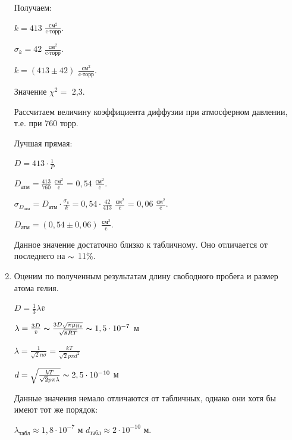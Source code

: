 \documentclass[a4paper,12pt]{article} %
\begin{document}
\begin{enumerate}
\newpage

Получаем:

$k = 413$ $\frac{\text{см}^2}{\text{c}\cdot\text{торр}}$.

$\sigma_{k} = 42$ $\frac{\text{см}^2}{\text{c}\cdot\text{торр}}$.

$k = (413 \pm 42)$ $\frac{\text{см}^2}{\text{c}\cdot\text{торр}}$.

\vspace{10mm}

Значение $\chi^2 = $ 2,3.

\vspace{15mm}

Рассчитаем величину коэффициента диффузии при атмосферном давлении, т.е. при 760 торр. 


Лучшая прямая:

$D = 413\cdot \frac{1}{P}$

$D_{\text{атм}} = \frac{413}{760}$ $\frac{\text{см}^2}{\text{c}}$ = $0,54$ $\frac{\text{см}^2}{\text{c}}$.

$\sigma_{D_{\text{атм}}} = D_{\text{атм}} \cdot \frac{\sigma_{k}}{k} = 0,54 \cdot \frac{42}{413}$ $\frac{\text{см}^2}{\text{c}}$ = $0,06$ $\frac{\text{см}^2}{\text{c}}$.


$D_{\text{атм}} = (0,54\pm 0,06)$ $\frac{\text{см}^2}{\text{c}}$.

Данное значение достаточно близко к табличному. Оно отличается от последнего на $\thicksim$ 11\%.


\item Оценим по полученным результатам длину свободного пробега и размер атома гелия.


$D = \frac{1}{3}\lambda\bar{v}$

$\lambda = \frac{3D}{\bar{v}} \thicksim \frac{3D\sqrt{\pi\mu_{\text{He}}}}{\sqrt{8RT}} \thicksim 1,5\cdot 10^{-7}$ м

$\lambda = \frac{1}{\sqrt{2}n\sigma} = \frac{kT}{\sqrt{2}p\pi d^2}$


$d = \sqrt{\frac{kT}{\sqrt{2}p\pi\lambda}} \thicksim 2,5\cdot 10^{-10}$ м


Данные значения немало отличаются от табличных, однако они хотя бы имеют тот же порядок:

$\lambda_{\text{табл}} \approx 1,8\cdot 10^{-7}$ м \hspace{60mm} $d_{\text{табл}} \approx 2\cdot 10^{-10}$ м.
\end{enumerate}

\newpage
\end{document}
